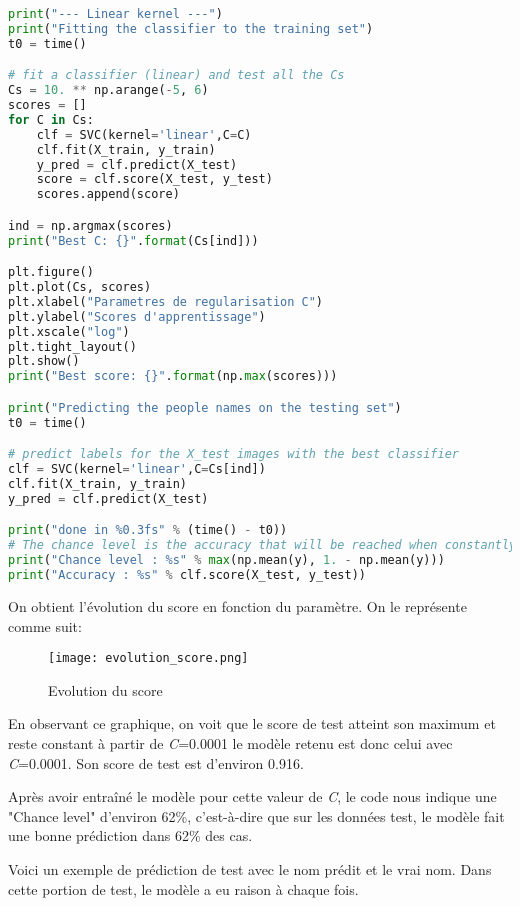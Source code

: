 \documentclass[a4paper, 12pt]{article}
\begin{document}
\begin{lstlisting}[language=Python, caption=Score du test en fonction de \textit{C}]
    print("--- Linear kernel ---")
print("Fitting the classifier to the training set")
t0 = time()

# fit a classifier (linear) and test all the Cs
Cs = 10. ** np.arange(-5, 6)
scores = []
for C in Cs:
    clf = SVC(kernel='linear',C=C)
    clf.fit(X_train, y_train)
    y_pred = clf.predict(X_test)
    score = clf.score(X_test, y_test)
    scores.append(score)

ind = np.argmax(scores)
print("Best C: {}".format(Cs[ind]))

plt.figure()
plt.plot(Cs, scores)
plt.xlabel("Parametres de regularisation C")
plt.ylabel("Scores d'apprentissage")
plt.xscale("log")
plt.tight_layout()
plt.show()
print("Best score: {}".format(np.max(scores)))

print("Predicting the people names on the testing set")
t0 = time()

# predict labels for the X_test images with the best classifier
clf = SVC(kernel='linear',C=Cs[ind])
clf.fit(X_train, y_train)
y_pred = clf.predict(X_test)

print("done in %0.3fs" % (time() - t0))
# The chance level is the accuracy that will be reached when constantly predicting the majority class.
print("Chance level : %s" % max(np.mean(y), 1. - np.mean(y)))
print("Accuracy : %s" % clf.score(X_test, y_test))
\end{lstlisting}

On obtient l'évolution du score en fonction du paramètre. 
On le représente comme suit: 

\begin{figure}[h!]
    \centering
    \texttt{[image: evolution\_score.png]}
    \caption{Evolution du score}
    \label{fig:placeholder}
\end{figure}

En observant ce graphique, on voit que le score de test atteint son maximum et reste constant à partir de \textit{C}=0.0001 le modèle retenu est donc celui avec \textit{C}=0.0001. Son score de test est d'environ 0.916.

Après avoir entraîné le modèle pour cette valeur de \textit{C}, le code nous indique une "Chance level" d'environ 62\%, c'est-à-dire que sur les données test, le modèle fait une bonne prédiction dans 62\% des cas. 

Voici un exemple de prédiction de test avec le nom prédit et le vrai nom. Dans cette portion de test, le modèle a eu raison à chaque fois. 
\end{document}
